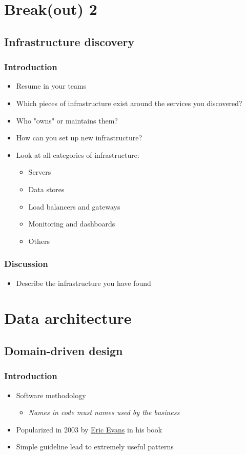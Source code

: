 \documentclass[8pt]{article}
\begin{document}
\section{Break(out) 2}
\label{sec:orgf26bd86}
\subsection{Infrastructure discovery}
\label{sec:org6e621f0}
\subsubsection{Introduction}
\label{sec:org3af5000}
\begin{itemize}
\item Resume in your teams
\item Which pieces of infrastructure exist around the services you discovered?
\item Who "owns" or maintains them?
\item How can you set up new infrastructure?
\item Look at all categories of infrastructure:
\begin{itemize}
\item Servers
\item Data stores
\item Load balancers and gateways
\item Monitoring and dashboards
\item Others
\end{itemize}
\end{itemize}
\subsubsection{Discussion}
\label{sec:orge35f034}
\begin{itemize}
\item Describe the infrastructure you have found
\end{itemize}
\section{Data architecture}
\label{sec:orgb2aab9e}
\subsection{Domain-driven design}
\label{sec:orgf88100a}
\subsubsection{Introduction}
\label{sec:orgf4f4b31}
\begin{itemize}
\item Software methodology
\begin{itemize}
\item \emph{Names in code must names used by the business}
\end{itemize}
\item Popularized in 2003 by \href{https://www.dddcommunity.org/book/evans\_2003/}{Eric Evans} in his book
\item Simple guideline lead to extremely useful patterns
\end{itemize}
\end{document}
